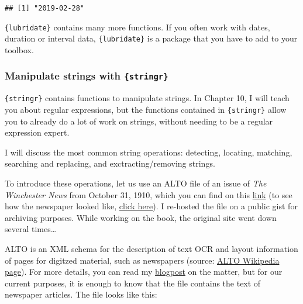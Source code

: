 \documentclass[
]{article}
\begin{document}
\begin{verbatim}
## [1] "2019-02-28"
\end{verbatim}

\texttt{\{lubridate\}} contains many more functions. If you often work with dates, duration or interval
data, \texttt{\{lubridate\}} is a package that you have to add to your toolbox.

\hypertarget{manipulate-strings-with-stringr}{%
\subsubsection{\texorpdfstring{Manipulate strings with \texttt{\{stringr\}}}{Manipulate strings with \{stringr\}}}\label{manipulate-strings-with-stringr}}

\texttt{\{stringr\}} contains functions to manipulate strings. In Chapter 10, I will teach you about regular
expressions, but the functions contained in \texttt{\{stringr\}} allow you to already do a lot of work on
strings, without needing to be a regular expression expert.

I will discuss the most common string operations: detecting, locating, matching, searching and
replacing, and exctracting/removing strings.

To introduce these operations, let us use an ALTO file of an issue of \emph{The Winchester News} from
October 31, 1910, which you can find on this
\href{https://gist.githubusercontent.com/b-rodrigues/5139560e7d0f2ecebe5da1df3629e015/raw/e3031d894ffb97217ddbad1ade1b307c9937d2c8/gistfile1.txt}{link} (to see
how the newspaper looked like,
\href{https://chroniclingamerica.loc.gov/lccn/sn86069133/1910-10-31/ed-1/seq-1/}{click here}). I re-hosted
the file on a public gist for archiving purposes. While working on the book, the original site went
down several times\ldots{}

ALTO is an XML schema for the description of text OCR and layout information of pages for digitzed
material, such as newspapers (source: \href{https://en.wikipedia.org/wiki/ALTO_(XML)}{ALTO Wikipedia page}).
For more details, you can read my
\href{https://www.brodrigues.co/blog/2019-01-13-newspapers_mets_alto/}{blogpost}
on the matter, but for our current purposes, it is enough to know that the file contains the text
of newspaper articles. The file looks like this:
\end{document}
